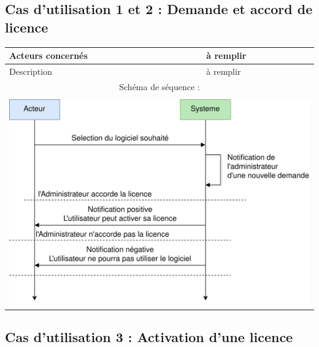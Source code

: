 \subsection{Cas d'utilisation 1 et 2 : Demande et accord de licence}

\begin{table}[!h]
	\centering
	\begin{tabular}{| m{5cm} | m{10cm} |}
		\hline
		    Acteurs concernés & à remplir \\
		\hline
		    Description & à remplir \\
		\hline
		    \multicolumn{2}{|c|}{Schéma de séquence :} \\
		\hline
		    \multicolumn{2}{|c|}{}\\
		    \multicolumn{2}{|c|}{\includegraphics[width=15cm]{main/png/seq_demande.png}} \\
		\hline
	\end{tabular}
	\label{tab:tab2}
\end{table}
\newpage

\subsection{Cas d'utilisation 3 : Activation d'une licence}

